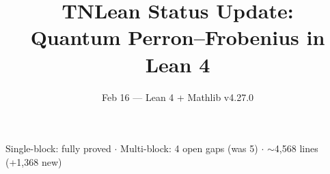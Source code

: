 \documentclass[aspectratio=169,10pt]{beamer}
\title{\textbf{TNLean Status Update:\\Quantum Perron--Frobenius in Lean 4}}
\subtitle{{\small Feb 16 --- Lean 4 + Mathlib v4.27.0}}
\date{}
\author{}
\begin{document}
{%
\begin{frame}
    \vspace{-1.5em}
    \maketitle
    \vspace{-3em}
    \begin{center}
        {\footnotesize
            \textcolor{dimwhite}{Single-block: \textcolor{leangreen}{fully proved} $\cdot$
            Multi-block: \textcolor{amber}{4 open gaps} (was 5) $\cdot$
            $\sim$4{,}568 lines (+1{,}368 new)}}
    \end{center}
\end{frame}
}
\end{document}
